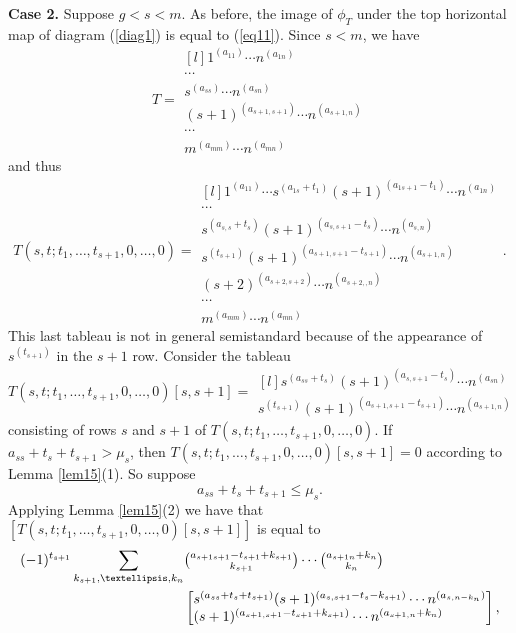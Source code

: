 \documentclass[11pt]{article}
\theoremstyle{definition}
\numberwithin{equation}{section}
\numberwithin{equation}{section}
\begin{document}
\textbf{Case 2.} Suppose $g<s<m.$ As before, the image of $\phi_T$ under the top horizontal map of diagram (\ref{diag1}) is equal to (\ref{eq11}). Since $s<m$, we have \begin{equation}T= \begin{matrix*}[l]
		1^{(a_{11})} \cdots n^{(a_{1n})} \\
		\cdots \\ 
		s^{(a_{ss})} \cdots n^{(a_{sn})} \\
		(s+1)^{(a_{s+1,s+1})} \cdots n^{(a_{s+1,n})}\\
		\cdots\\
		m^{(a_{mm})} \cdots n^{(a_{mn})}  \end{matrix*}\end{equation}
and thus 
\begin{equation*}\label{case21}T(s,t;t_1,\dots,t_{s+1},0,\dots,0)= \begin{matrix*}[l]
		1^{(a_{11})} \cdots s^{(a_{1s}+t_1)}(s+1)^{(a_{1s+1}-t_1)} \cdots n^{(a_{1n})} \\
		\cdots \\ 
		s^{(a_{s,s}+t_s)}(s+1)^{(a_{s,s+1}-t_s)} \cdots n^{(a_{s,n})} \\
		s^{(t_{s+1})}(s+1)^{(a_{s+1,s+1}-t_{s+1})} \cdots n^{(a_{s+1,n})}\\
		(s+2)^{(a_{s+2,s+2})}\cdots n^{(a_{s+2,,n})} \\
		\cdots\\
		m^{(a_{mm})} \cdots n^{(a_{mn})}  \end{matrix*}.\end{equation*}
	This last tableau is not in general semistandard because of the appearance of $s^{(t_{s+1})}$ in the $s+1$ row. Consider the tableau \begin{equation}\label{eq117}T(s,t;t_1,\dots,t_{s+1},0,\dots,0)[s,s+1]=\begin{matrix*}[l] 
			s^{(a_{ss}+t_s)}(s+1)^{(a_{s,s+1}-t_s)} \cdots n^{(a_{sn})} \\
			s^{(t_{s+1})}(s+1)^{(a_{s+1,s+1}-t_{s+1})} \cdots n^{(a_{s+1,n})} \end{matrix*} \end{equation} consisting of rows $s$ and $s+1$ of $T(s,t;t_1,\dots,t_{s+1},0,\dots,0)$. If $a_{ss}+t_s+t_{s+1} > \mu_s$, then $T(s,t;t_1,\dots,t_{s+1},0,\dots,0)[s,s+1]=0$ according to Lemma \ref{lem15}(1). So suppose \begin{equation}\label{case2n1}a_{ss}+t_s+t_{s+1} \le \mu_s.\end{equation} Applying Lemma \ref{lem15}(2) we have that $[T(s,t;t_1,\dots,t_{s+1},0,\dots,0)[s,s+1]]$ is equal to \begin{align*}
		(-1)^{t_{s+1}}\sum_{k_{s+1},\dots,k_n}&\tbinom{a_{s+1s+1}-t_{s+1}+k_{s+1}}{k_{s+1}}\cdots\tbinom{a_{s+1n}+k_n}{k_n}\\
		&\begin{bmatrix*}[l] 
			s^{(a_{ss}+t_s+t_{s+1})}(s+1)^{(a_{s,s+1}-t_s-k_{s+1})} \cdots n^{(a_{s,n-k_n})} \\
			(s+1)^{(a_{s+1,s+1}-t_{s+1}+k_{s+1})} \cdots n^{(a_{s+1,n}+k_n)} \end{bmatrix*},
	\end{align*} 
\end{document}
